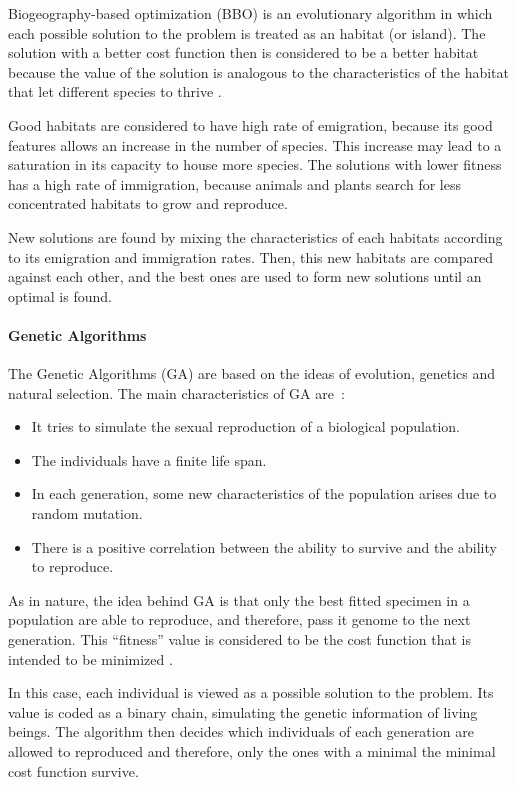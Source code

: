 Biogeography-based optimization (BBO) is an evolutionary algorithm in which each possible solution to the problem is treated as an habitat (or island). The solution with a better cost function then is considered to be a better habitat  because the value of the solution is analogous to the characteristics of the habitat that let different species to thrive \citep{Simon2008}.

Good habitats are considered to have high rate of emigration, because its good features allows an increase in the number of species. This increase may lead to a saturation in its capacity to house more species. The solutions with lower fitness has a high rate of immigration, because animals and plants search for less concentrated habitats to grow and reproduce.

New solutions are found by mixing the characteristics of each habitats according to its emigration and immigration rates. Then, this new habitats are compared against each other, and the best ones are used to form new solutions until an optimal is found.

\paragraph{Genetic Algorithms}
The Genetic Algorithms (GA) are based on the ideas of evolution, genetics and natural selection. The main characteristics of GA are~\citep{Simon2013}:
%
\begin{itemize}
	\item It tries to simulate the sexual reproduction of a biological population.
	\item The individuals have a finite life span.
	\item In each generation, some new characteristics of the population arises due to random mutation.
	\item There is a positive correlation between the ability to survive and the ability to reproduce.
\end{itemize}

As in nature, the idea behind GA is that only the best fitted specimen in a population are able to reproduce, and therefore, pass it genome to the next generation. This ``fitness'' value is considered to be the cost function that is intended to be minimized \citep{Mitchell1995}.

In this case, each individual is viewed as a possible solution to the problem. Its value is coded as a binary chain, simulating the genetic information of living beings. The algorithm then decides which individuals of each generation are allowed to reproduced and therefore, only the ones with a minimal the minimal cost function survive.
%
